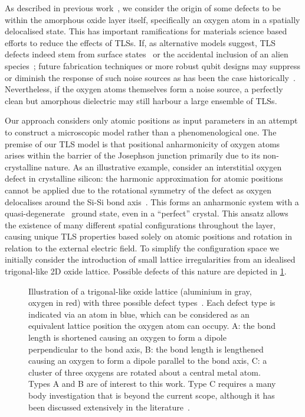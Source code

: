 As described in previous work~\cite{DuBois2013}, we consider the origin of some defects to be within the amorphous oxide layer itself, specifically an oxygen atom in a spatially delocalised state.
This has important ramifications for materials science based efforts to reduce the effects of TLSs.
If, as alternative models suggest, TLS defects indeed stem from surface states~\cite{Choi2009} or the accidental inclusion of an alien species~\cite{Jameson2011, Holder2013}; future fabrication techniques or more robust qubit designs may suppress or diminish the response of such noise sources as has been the case historically~\cite{Vion2002, Martinis2005, Koch2007, Schreier2008, Houck2008}.
Nevertheless, if the oxygen atoms themselves form a noise source, a perfectly clean but amorphous dielectric may still harbour a large ensemble of TLSs.

Our approach considers only atomic positions as input parameters in an attempt to construct a microscopic model rather than a phenomenological one.
The premise of our TLS model is that positional anharmonicity of oxygen atoms arises within the  barrier of the Josephson junction primarily due to its non-crystalline nature.
As an illustrative example, consider an interstitial oxygen defect in crystalline silicon: the harmonic approximation for atomic positions cannot be applied due to the rotational symmetry of the defect as oxygen delocalises around the Si-Si bond axis~\cite{Artacho1995}.
This forms an anharmonic system with a quasi-degenerate~\cite{DuBois2013} ground state, even in a ``perfect'' crystal.
This ansatz allows the existence of many different spatial configurations throughout the layer, causing unique TLS properties based solely on atomic positions and rotation in relation to the external electric field.
To simplify the configuration space we initially consider the introduction of small lattice irregularities from an idealised trigonal-like 2D oxide lattice.
Possible defects of this nature are depicted in \cref{fig:defects}. 

\begin{figure}[htp]
  \hspace{0.2\textwidth}\centering
  \caption[fig1]{\label{fig:defects}Illustration of a trigonal-like oxide lattice (aluminium in gray, oxygen in red) with three possible defect types~\cite{Zachariasen1932, Enss2005}. Each defect type is indicated via an atom in blue, which can be considered as an equivalent lattice position the oxygen atom can occupy.  A: the bond length is shortened causing an oxygen to form a dipole perpendicular to the bond axis, B: the bond length is lengthened causing an oxygen to form a dipole parallel to the bond axis, C: a cluster of three oxygens are rotated about a central metal atom. Types A and B are of interest to this work. Type C requires a many body investigation that is beyond the current scope, although it has been discussed extensively in the literature~\cite{Buchenau1984,Heuer1998,Trachenko2000,Reinisch2005}.}
\end{figure}

